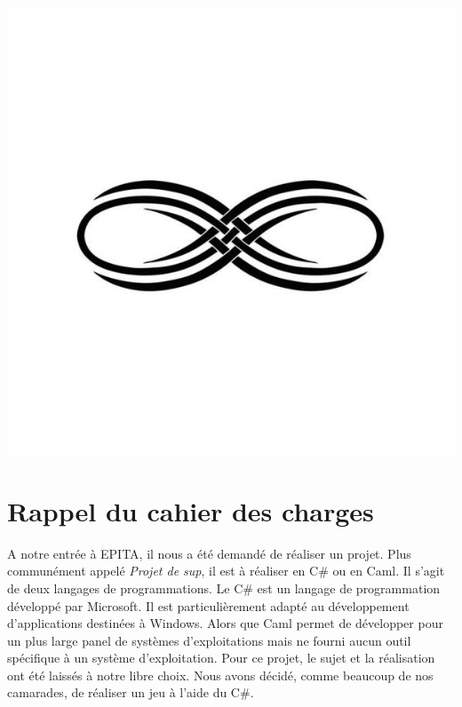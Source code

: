 \documentclass[12pt]{article}
\begin{document}
\begin{center}
\includegraphics[scale=00.20]{infini}
\end{center}


\setlength{\headheight}{13pt} %
\setlength{\headsep}{2.5cm} %
\setlength{\footskip}{2.5cm}



\setcounter{tocdepth}{2} 

\newpage
\thispagestyle{empty}
\pagestyle{fancyplain} \chead{} 
\tableofcontents


\newpage

\section{Rappel du cahier des charges}

A notre entrée à EPITA, il nous a été demandé de réaliser un projet. Plus communément appelé \textit{Projet de sup}, il est à réaliser en C\# ou en Caml. Il s'agit de deux langages de programmations. Le C\# est un langage de programmation développé par Microsoft. Il est particulièrement adapté au développement d'applications destinées à Windows. Alors que Caml permet de développer pour un plus large panel de systèmes d'exploitations mais ne fourni aucun outil spécifique à un système d'exploitation. Pour ce projet, le sujet et la réalisation ont été laissés à notre libre choix. Nous avons décidé, comme beaucoup de nos camarades, de réaliser un jeu à l'aide du C\#.
\end{document}
